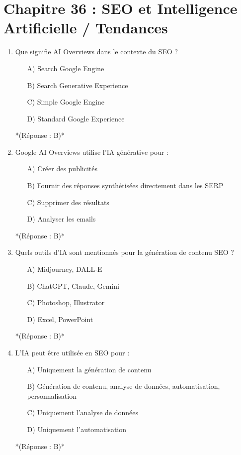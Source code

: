 \documentclass[12pt,a4paper,twoside]{report}
\begin{document}
\section*{Chapitre 36 : SEO et Intelligence Artificielle / Tendances}
\begin{enumerate}
    \item Que signifie AI Overviews dans le contexte du SEO ?
    \begin{itemize}
        \item[A)] Search Google Engine
        \item[B)] Search Generative Experience
        \item[C)] Simple Google Engine
        \item[D)] Standard Google Experience
    \end{itemize}
    *(Réponse : B)*

    \item Google AI Overviews utilise l'IA générative pour :
    \begin{itemize}
        \item[A)] Créer des publicités
        \item[B)] Fournir des réponses synthétisées directement dans les SERP
        \item[C)] Supprimer des résultats
        \item[D)] Analyser les emails
    \end{itemize}
    *(Réponse : B)*

    \item Quels outils d'IA sont mentionnés pour la génération de contenu SEO ?
    \begin{itemize}
        \item[A)] Midjourney, DALL-E
        \item[B)] ChatGPT, Claude, Gemini
        \item[C)] Photoshop, Illustrator
        \item[D)] Excel, PowerPoint
    \end{itemize}
    *(Réponse : B)*

    \item L'IA peut être utilisée en SEO pour :
    \begin{itemize}
        \item[A)] Uniquement la génération de contenu
        \item[B)] Génération de contenu, analyse de données, automatisation, personnalisation
        \item[C)] Uniquement l'analyse de données
        \item[D)] Uniquement l'automatisation
    \end{itemize}
    *(Réponse : B)*


\end{enumerate}
\end{document}
